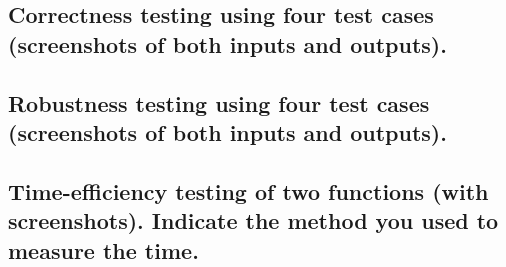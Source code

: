 \documentclass[letterpaper, 12 pt, conference]{ieeeconf}
\begin{document}
\subsection{Correctness testing using four test cases (screenshots of both inputs and outputs).}
\subsection{Robustness testing using four test cases (screenshots of both inputs and outputs).}
\subsection{Time-eﬀiciency testing of two functions (with screenshots). Indicate the method you used to measure the time.}



\addtolength{\textheight}{-12cm}








\newpage





\end{document}
